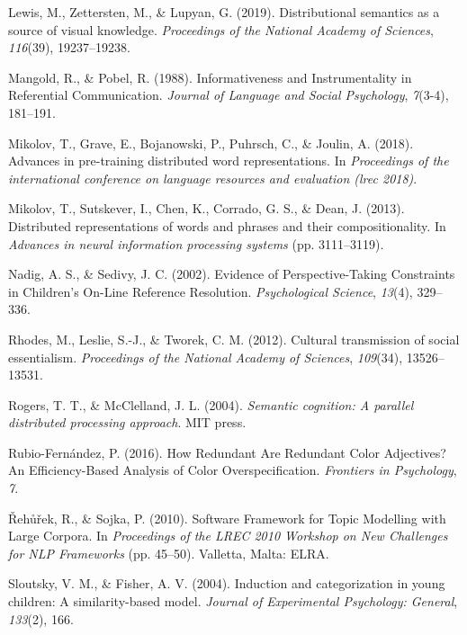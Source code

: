 \documentclass[10pt, letterpaper]{article}
\begin{document}
\leavevmode\hypertarget{ref-lewis2019}{}%
Lewis, M., Zettersten, M., \& Lupyan, G. (2019). Distributional
semantics as a source of visual knowledge. \emph{Proceedings of the
National Academy of Sciences}, \emph{116}(39), 19237--19238.

\leavevmode\hypertarget{ref-mangold1988}{}%
Mangold, R., \& Pobel, R. (1988). Informativeness and Instrumentality in
Referential Communication. \emph{Journal of Language and Social
Psychology}, \emph{7}(3-4), 181--191.

\leavevmode\hypertarget{ref-mikolov2018}{}%
Mikolov, T., Grave, E., Bojanowski, P., Puhrsch, C., \& Joulin, A.
(2018). Advances in pre-training distributed word representations. In
\emph{Proceedings of the international conference on language resources
and evaluation (lrec 2018)}.

\leavevmode\hypertarget{ref-mikolov2013}{}%
Mikolov, T., Sutskever, I., Chen, K., Corrado, G. S., \& Dean, J.
(2013). Distributed representations of words and phrases and their
compositionality. In \emph{Advances in neural information processing
systems} (pp. 3111--3119).

\leavevmode\hypertarget{ref-nadig2002}{}%
Nadig, A. S., \& Sedivy, J. C. (2002). Evidence of Perspective-Taking
Constraints in Children's On-Line Reference Resolution.
\emph{Psychological Science}, \emph{13}(4), 329--336.

\leavevmode\hypertarget{ref-rhodes2012}{}%
Rhodes, M., Leslie, S.-J., \& Tworek, C. M. (2012). Cultural
transmission of social essentialism. \emph{Proceedings of the National
Academy of Sciences}, \emph{109}(34), 13526--13531.

\leavevmode\hypertarget{ref-rogers2004}{}%
Rogers, T. T., \& McClelland, J. L. (2004). \emph{Semantic cognition: A
parallel distributed processing approach}. MIT press.

\leavevmode\hypertarget{ref-rubio-fernandez2016}{}%
Rubio-Fernández, P. (2016). How Redundant Are Redundant Color
Adjectives? An Efficiency-Based Analysis of Color Overspecification.
\emph{Frontiers in Psychology}, \emph{7}.

\leavevmode\hypertarget{ref-rehurek2010}{}%
Řehůřek, R., \& Sojka, P. (2010). Software Framework for Topic Modelling
with Large Corpora. In \emph{Proceedings of the LREC 2010 Workshop on
New Challenges for NLP Frameworks} (pp. 45--50). Valletta, Malta: ELRA.

\leavevmode\hypertarget{ref-sloutsky2004}{}%
Sloutsky, V. M., \& Fisher, A. V. (2004). Induction and categorization
in young children: A similarity-based model. \emph{Journal of
Experimental Psychology: General}, \emph{133}(2), 166.
\end{document}
